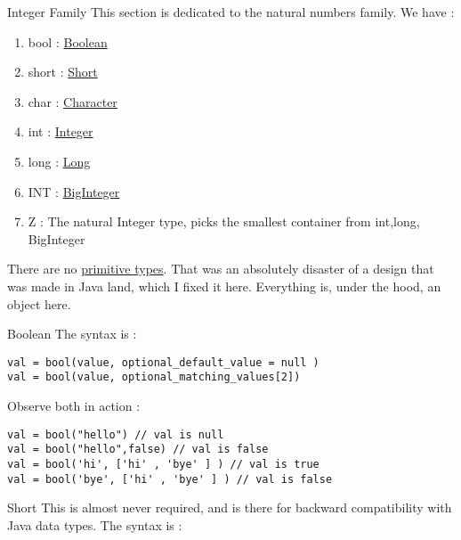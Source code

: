 \begin{section}{Integer Family}
This section is dedicated to the natural numbers family.
We have :
\begin{enumerate}
\item{bool : \href{https://docs.oracle.com/javase/8/docs/api/java/lang/Boolean.html}{Boolean} }
\item{short : \href{https://docs.oracle.com/javase/8/docs/api/java/lang/Short.html}{Short} }
\item{char :  \href{https://docs.oracle.com/javase/8/docs/api/java/lang/Character.html}{Character} }
\item{int : \href{https://docs.oracle.com/javase/8/docs/api/java/lang/Integer.html}{Integer} }
\item{long : \href{https://docs.oracle.com/javase/8/docs/api/java/lang/Long.html}{Long} }
\item{INT : \href{https://docs.oracle.com/javase/8/docs/api/java/math/BigInteger.html}{BigInteger} }
\item{Z : The natural Integer type, picks the smallest container from int,long, BigInteger}
\end{enumerate}
There are no \href{https://docs.oracle.com/javase/tutorial/java/nutsandbolts/datatypes.html}{primitive types}. 
That was an absolutely disaster of a design that was made in Java land, which I fixed it here.
Everything is, under the hood, an object here. 

\begin{subsection}{Boolean}
The syntax is :
\begin{lstlisting}[style=JexlStyle]
val = bool(value, optional_default_value = null )
val = bool(value, optional_matching_values[2])
\end{lstlisting}
Observe both in action :
\begin{center}\begin{minipage}{\linewidth}
\begin{lstlisting}[style=JexlStyle]
val = bool("hello") // val is null
val = bool("hello",false) // val is false
val = bool('hi', ['hi' , 'bye' ] ) // val is true 
val = bool('bye', ['hi' , 'bye' ] ) // val is false 
\end{lstlisting}
\end{minipage}\end{center}

\end{subsection}

\begin{subsection}{Short}
This is almost never required, and is there for backward compatibility with Java data types.
The syntax is :


\end{subsection}
\end{section}
